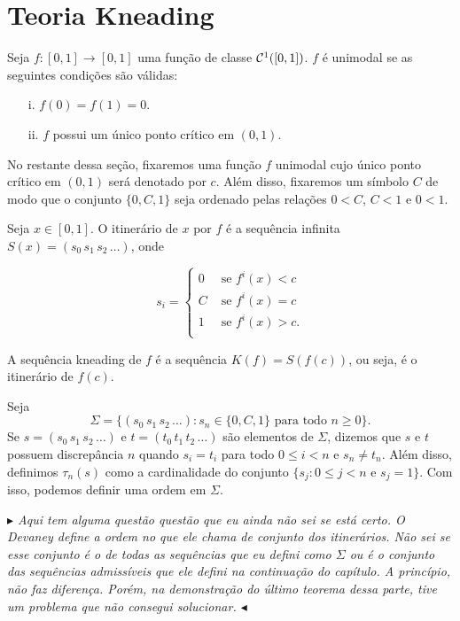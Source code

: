 \section{Teoria Kneading}

\begin{definition}
Seja $f: [0, 1] \to [0, 1]$ uma função de classe $\mathcal{C}^1([0, 1])$. $f$ é unimodal se as seguintes condições são válidas:
\begin{enumerate}
\item[i.] $f(0) = f(1) = 0$.
\item[ii.] $f$ possui um único ponto crítico em $(0, 1)$.
\end{enumerate}
\end{definition}

No restante dessa seção, fixaremos uma função $f$ unimodal cujo único ponto crítico em $(0, 1)$ será denotado por $c$. Além disso, fixaremos um símbolo $C$ de modo que o conjunto $\{0, C, 1\}$ seja ordenado pelas relações $0 < C$, $C < 1$ e $0 < 1$.


\begin{definition}
Seja $x \in [0, 1]$. O itinerário de $x$ por $f$ é a sequência infinita $S(x) = (s_0 \, s_1 \, s_2 \, \dots)$, onde

\[ s_i = 
\begin{cases} 
  0 & \text{ se } f^i(x) < c \\
  C & \text{ se } f^i(x) = c \\
  1 & \text{ se } f^i(x) > c. \\
\end{cases}
\]
\end{definition}

\begin{definition}
A sequência kneading de $f$ é a sequência $K(f) = S(f(c))$, ou seja, é o itinerário de $f(c)$.
\end{definition}

Seja $$\Sigma = \{ (s_0\, s_1\, s_2\, \dots) : s_n \in \{0, C, 1\} \text{ para todo } n \geq 0\}.$$ Se $s = (s_0\, s_1\, s_2\, \dots)$ e $t = (t_0\, t_1\, t_2\, \dots)$ são elementos de $\Sigma$, dizemos que $s$ e $t$ possuem discrepância $n$ quando $s_i = t_i$ para todo $0 \leq i < n$ e $s_n \neq t_n$. Além disso, definimos $\tau_n(s)$ como a cardinalidade do conjunto $\{ s_j : 0 \leq j < n \text{ e } s_j = 1 \}$. Com isso, podemos definir uma ordem em $\Sigma$.

\textit{$\blacktriangleright$ Aqui tem alguma questão questão que eu ainda não sei se está certo. O Devaney define a ordem no que ele chama de \textit{conjunto dos itinerários}. Não sei se esse conjunto é o de todas as sequências que eu defini como $\Sigma$ ou é o conjunto das sequências admissíveis que ele defini na continuação do capítulo. A princípio, não faz diferença. Porém, na demonstração do último teorema dessa parte, tive um problema que não consegui solucionar. $\blacktriangleleft$}

